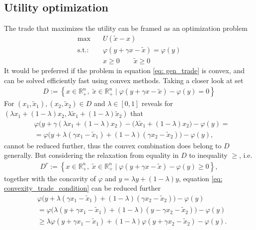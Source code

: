 \subsection{Utility optimization}
The trade that maximizes the utility can be framed as an optimization problem
\begin{align}
    \text{max} \quad &U(\tilde{x} - x) \label{eq: gen_trade}\\
    \text{s.t.:}\quad & \varphi(y + \gamma x - \tilde{x}) =
    \varphi(y)\nonumber \\
      &x\ge 0 \qquad \tilde{x} \ge 0\nonumber
\end{align}
It would be preferred if the problem in equation \ref{eq: gen_trade} is
convex, and can be solved efficiently fast using convex methods. Taking a
closer look at set
\begin{align}
    D := \left\{ x \in \mathbb{R}^{n}_+,\; \tilde{x} \in \mathbb{R}^{n}_+\;
    |\;
    \varphi(y + \gamma x - \tilde{x}) - \varphi(y) =0
\right\}
\end{align}
For $(x_1, \tilde{x}_1), (x_2, \tilde{x}_2) \in D$ and $\lambda \in [0, 1]$
reveals for $\left(\lambda x_1 + (1-\lambda)x_2, \lambda \tilde{x}_1
+(1-\lambda)\tilde{x}_2\right)$ that
\begin{align}
    &\varphi\Big( y+\gamma(\lambda x_1 + (1-\lambda)x_2) - (\lambda
    \tilde{x}_1 + (1-\lambda)x_2 \Big) - \varphi(y) =\\
    &=
    \varphi\Big(y + \lambda(\gamma x_1 - \tilde{x}_1) + (1-\lambda)(\gamma
    x_2 - \tilde{x}_2)\Big) - \varphi(y),\label{eq: convexity_trade_condition}
\end{align}
cannot be reduced further, thus the convex combination does belong to $D$
generally. But considering the relaxation from equality in $D$ to inequality
$\ge$, i.e.
\begin{align}
    D^{r} := \left\{ x \in \mathbb{R}^{n}_+,\; \tilde{x} \in \mathbb{R}^{n}_+\;
    |\;
    \varphi(y + \gamma x - \tilde{x}) - \varphi(y) \ge 0
\right\},
\end{align}
together with the concavity of $\varphi$ and $y = \lambda y + (1-\lambda)y$,
equation \ref{eq: convexity_trade_condition} can be reduced further
\begin{align}
    &\varphi\Big(y + \lambda(\gamma x_1 - \tilde{x}_1) + (1-\lambda)(\gamma
    x_2 - \tilde{x}_2)\Big) - \varphi(y) \\
    &=
    \varphi\Big(\lambda(y + \gamma x_1 - \tilde{x}_1) + (1-\lambda)(y - \gamma
    x_2 - \tilde{x}_2)\Big) - \varphi(y) \\
    &\ge \lambda \varphi(y + \gamma x_1 - \tilde{x}_1)
    + (1-\lambda)\varphi(y+\gamma x_2 - \tilde{x}_2) - \varphi(y).
\end{align}
